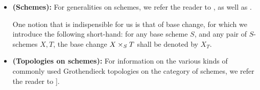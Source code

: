         \begin{convention} \label{conv: algebraic_geometry}
            \noindent
            \begin{itemize}
                \item \textbf{(Schemes):} For generalities on schemes, we refer the reader to \cite[Chapters II and III]{hartshorne}, as well as \cite[\href{https://stacks.math.columbia.edu/tag/01H8}{Tag 01H8}, \href{https://stacks.math.columbia.edu/tag/01QL}{Tag 01QL}, and \href{https://stacks.math.columbia.edu/tag/0209}{Tag 0209}]{stacks}.
                
                One notion that is indispensible for us is that of base change, for which we introduce the following short-hand: for any base scheme $S$, and any pair of $S$-schemes $X, T$, the base change $X \x_S T$ shall be denoted by $X_T$.
                \item \textbf{(Topologies on schemes):} For information on the various kinds of commonly used Grothendieck topologies on the category of schemes, we refer the reader to \cite[\href{https://stacks.math.columbia.edu/tag/020K}{Tag 020K} and \href{https://stacks.math.columbia.edu/tag/0238}{Tag 0238}]{stacks}].
            \end{itemize}
        \end{convention}